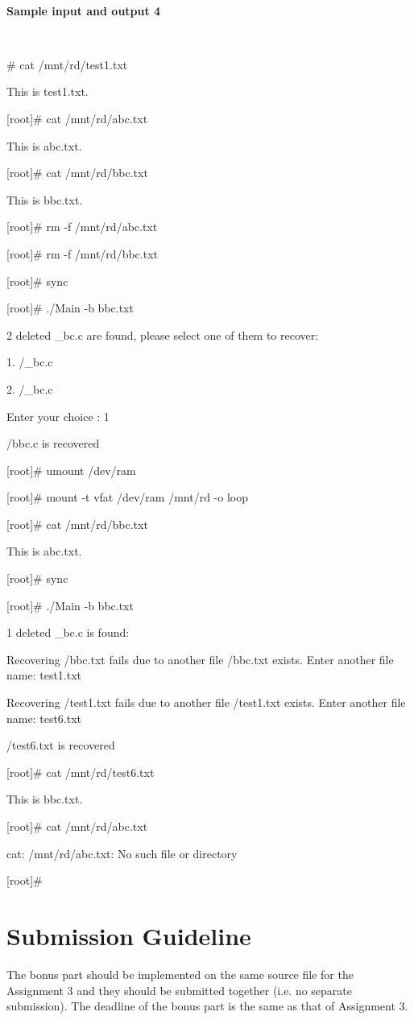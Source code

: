 \documentclass[a4paper,12pt]{article}
\begin{document}
~

\noindent \textbf{Sample input and output 4}

~

\begin{tt}
[root]\# cat /mnt/rd/test1.txt

This is test1.txt.

[root]\# cat /mnt/rd/abc.txt

This is abc.txt.

[root]\# cat /mnt/rd/bbc.txt

This is bbc.txt.

[root]\# rm -f /mnt/rd/abc.txt

[root]\# rm -f /mnt/rd/bbc.txt

[root]\# sync

[root]\# ./Main -b bbc.txt

2 deleted \_bc.c are found, please select one of them to recover:

1. /\_bc.c

2. /\_bc.c

Enter your choice : 1

/bbc.c is recovered

[root]\# umount /dev/ram

[root]\# mount -t vfat /dev/ram /mnt/rd -o loop

[root]\# cat /mnt/rd/bbc.txt

This is abc.txt.

[root]\# sync

[root]\# ./Main -b bbc.txt

1 deleted \_bc.c is found:

Recovering /bbc.txt fails due to another file
/bbc.txt exists. Enter another file name: test1.txt

Recovering /test1.txt fails due to another file
/test1.txt exists. Enter another file name: test6.txt

/test6.txt is recovered

[root]\# cat /mnt/rd/test6.txt

This is bbc.txt.

[root]\# cat /mnt/rd/abc.txt

cat: /mnt/rd/abc.txt: No such file or directory

[root]\#

\end{tt}

\section*{Submission Guideline}

The bonus part should be implemented on the same source file for the Assignment 3 and they should be submitted together (i.e. no separate submission). The deadline of the bonus part is the same as that of Assignment 3.
\end{document}
